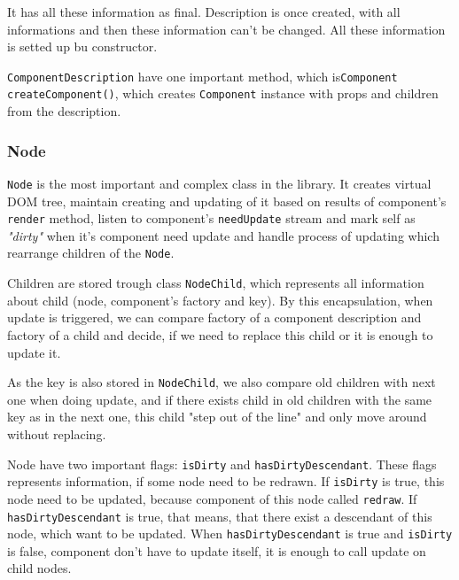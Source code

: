 \documentclass[oneside, 12pt]{book}
\begin{document}
      It has all these information as final. Description is once created, 
      with all informations and then these information can't be changed. 
      All these information is setted up bu constructor. 

      \texttt{ComponentDescription} have one important method, which is\texttt{Component createComponent()}, 
      which creates \texttt{Component} instance with props and children from the description.

    \subsubsection{Node}\label{subsubsec:our-architecture-core-node}
      \texttt{Node} is the most important and complex class in the library.
      It creates virtual DOM tree, maintain creating and updating of it based on results of component's \texttt{render} method, 
      listen to component's \texttt{needUpdate} stream and mark self as \textit{"dirty"} when it's component need update 
      and handle process of updating which rearrange children of the \texttt{Node}.

      Children are stored trough class \texttt{NodeChild}, which represents all information about child (node, component's factory and key). 
      By this encapsulation, when update is triggered, we can compare factory of a component description and factory of a child 
      and decide, if we need to replace this child or it is enough to update it. 

      As the key is also stored in \texttt{NodeChild}, we also compare old children with next one when doing update, 
      and if there exists child in old children with the same key as in the next one, this child "step out of the line" 
      and only move around without replacing.
      
      Node have two important flags: \texttt{isDirty} and \texttt{hasDirtyDescendant}. 
      These flags represents information, if some node need to be redrawn.
      If \texttt{isDirty} is true, this node need to be updated, 
      because component of this node called \texttt{redraw}.
      If \texttt{hasDirtyDescendant} is true, that means, 
      that there exist a descendant of this node, which want to be updated.
      When \texttt{hasDirtyDescendant} is true and \texttt{isDirty} is false, 
      component don't have to update itself, it is enough to call update on child nodes.
\end{document}
